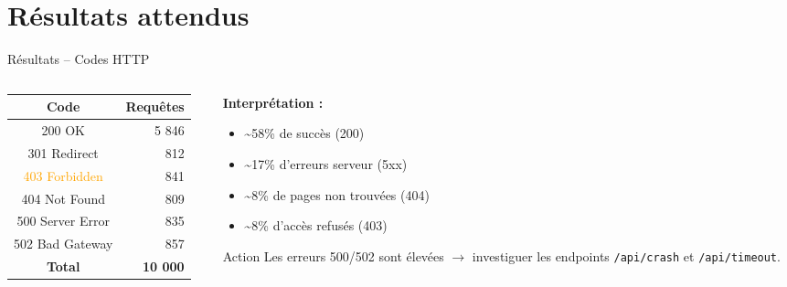 \documentclass[aspectratio=169, 11pt]{beamer}
\begin{document}
\section{Résultats attendus}

\begin{frame}{Résultats -- Codes HTTP}
  \begin{columns}[T]
    \begin{column}{0.45\textwidth}
      \begin{table}
        \centering
        \begin{tabular}{cr}
          \toprule
          \textbf{Code} & \textbf{Requêtes} \\
          \midrule
          \textcolor{hadoopGreen}{200 OK} & 5 846 \\
          \textcolor{hadoopBlue}{301 Redirect} & 812 \\
          \textcolor{orange}{403 Forbidden} & 841 \\
          \textcolor{hadoopYellow!80!black}{404 Not Found} & 809 \\
          \textcolor{hadoopRed}{500 Server Error} & 835 \\
          \textcolor{hadoopRed!70}{502 Bad Gateway} & 857 \\
          \midrule
          \textbf{Total} & \textbf{10 000} \\
          \bottomrule
        \end{tabular}
      \end{table}
    \end{column}
    \begin{column}{0.5\textwidth}
      \textbf{Interprétation :}
      \begin{itemize}
        \item \textasciitilde58\% de succès (200)
        \item \textasciitilde17\% d'erreurs serveur (5xx)
        \item \textasciitilde8\% de pages non trouvées (404)
        \item \textasciitilde8\% d'accès refusés (403)
      \end{itemize}

      \vspace{0.5em}
      \begin{alertblock}{\scriptsize Action}
        Les erreurs 500/502 sont élevées $\rightarrow$ investiguer les endpoints \texttt{/api/crash} et \texttt{/api/timeout}.
      \end{alertblock}
    \end{column}
  \end{columns}
\end{frame}
\end{document}

